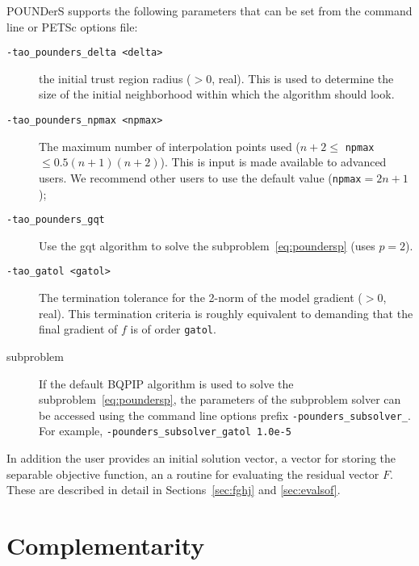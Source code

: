 POUNDerS supports the following parameters that can be set from the
command line or PETSc options file:
\begin{description}
  \item[\texttt{-tao\_pounders\_delta <delta>}] the initial trust region 
  radius ($>0$, real).
  This is  used to determine the size of the initial neighborhood within
  which the algorithm should look. 
  
  \item[\texttt{-tao\_pounders\_npmax <npmax>}] The maximum number of 
  interpolation points used
  ($n+2\leq$ \texttt{npmax} $\leq 0.5(n+1)(n+2)$). This is input is made
  available to advanced users. We recommend other users to use the default
  value (\texttt{npmax}$=2n+1$);

  \item[\texttt{-tao\_pounders\_gqt}] Use the gqt algorithm to solve the
  subproblem~\ref{eq:poundersp} (uses $p=2$).

  \item[\texttt{-tao\_gatol <gatol>}] The termination tolerance for the 2-norm of the
  model gradient ($>0$, real). This termination criteria is roughly
  equivalent to demanding that the final gradient of $f$ is of order
  \texttt{gatol}.

  \item[subproblem] If the default BQPIP algorithm is used to solve the 
  subproblem~\ref{eq:poundersp}, the parameters of the subproblem solver
  can be accessed using the command line options prefix \texttt{-pounders\_subsolver\_}.  For example, \texttt{-pounders\_subsolver\_gatol 1.0e-5}
  
   
\end{description}

In addition the user provides an initial solution vector, a vector for storing
the separable objective function, an a routine for evaluating the residual
vector $F$.  These are described in detail in Sections~\ref{sec:fghj} and \ref{sec:evalsof}.



\section{Complementarity}
\label{sec:complementarity}

